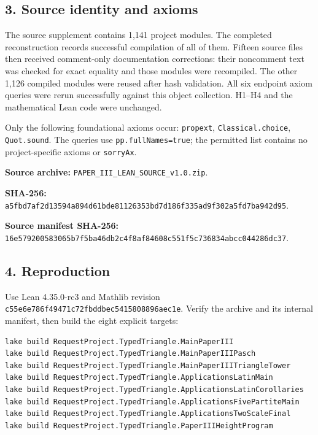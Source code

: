 \documentclass[english,11pt,a4paper]{article}
\begin{document}
\subsection{3. Source identity and axioms}\label{source-identity-and-axioms}

The source supplement contains 1,141 project modules. The completed reconstruction records successful compilation of all of them. Fifteen source files then received comment-only documentation corrections: their noncomment text was checked for exact equality and those modules were recompiled. The other 1,126 compiled modules were reused after hash validation. All six endpoint axiom queries were rerun successfully against this object collection. H1--H4 and the mathematical Lean code were unchanged.

Only the following foundational axioms occur: \texttt{propext}, \texttt{Classical.\allowbreak{}choice}, \texttt{Quot.\allowbreak{}sound}. The queries use \texttt{pp.\allowbreak{}full\allowbreak{}Names=true}; the permitted list contains no project-specific axioms or \texttt{sorry\allowbreak{}Ax}.

\textbf{Source archive:} \texttt{PAPER\_\allowbreak{}III\_\allowbreak{}LEAN\_\allowbreak{}SOURCE\_\allowbreak{}v1.\allowbreak{}0.\allowbreak{}zip}.

\textbf{SHA-256:} \texttt{a5fbd7af2d13594a\allowbreak{}894d61bde8112635\allowbreak{}3bd7d186f335ad9f\allowbreak{}302a5fd7ba942d95}.

\textbf{Source manifest SHA-256:}\\
\texttt{16e579200583065b\allowbreak{}7f5ba46db2c4f8af\allowbreak{}84608c551f5c7368\allowbreak{}34abcc044286dc37}.

\subsection{4. Reproduction}\label{reproduction}

Use Lean 4.35.0-rc3 and Mathlib revision \texttt{c55e6e786f49471c\allowbreak{}72fbddbec5415808\allowbreak{}896aec1e}. Verify the archive and its internal manifest, then build the eight explicit targets:

\begingroup\scriptsize\begin{verbatim}
lake build RequestProject.TypedTriangle.MainPaperIII
lake build RequestProject.TypedTriangle.MainPaperIIIPasch
lake build RequestProject.TypedTriangle.MainPaperIIITriangleTower
lake build RequestProject.TypedTriangle.ApplicationsLatinMain
lake build RequestProject.TypedTriangle.ApplicationsLatinCorollaries
lake build RequestProject.TypedTriangle.ApplicationsFivePartiteMain
lake build RequestProject.TypedTriangle.ApplicationsTwoScaleFinal
lake build RequestProject.TypedTriangle.PaperIIIHeightProgram
\end{verbatim}\endgroup
\end{document}
